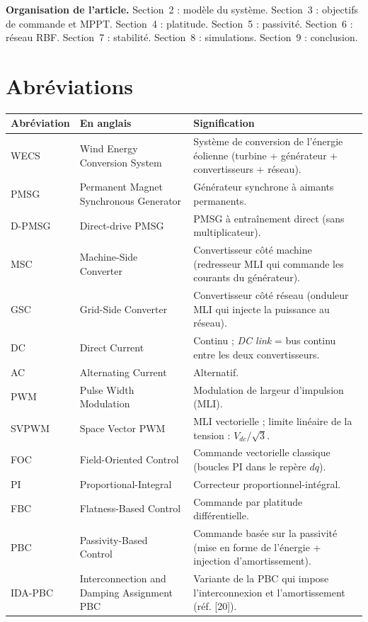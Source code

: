 \documentclass[11pt,a4paper]{article}
\begin{document}
\textbf{Organisation de l'article.} Section~2 : modèle du système. Section~3 : objectifs de commande et
MPPT. Section~4 : platitude. Section~5 : passivité. Section~6 : réseau RBF. Section~7 : stabilité.
Section~8 : simulations. Section~9 : conclusion.

\section{Abréviations}
\begin{longtable}{@{}p{1.9cm}p{5.6cm}p{7.4cm}@{}}
\toprule
Abréviation & En anglais & Signification\\
\midrule
\endhead
WECS & Wind Energy Conversion System & Système de conversion de l'énergie éolienne (turbine + générateur + convertisseurs + réseau).\\
PMSG & Permanent Magnet Synchronous Generator & Générateur synchrone à aimants permanents.\\
D-PMSG & Direct-drive PMSG & PMSG à entraînement direct (sans multiplicateur).\\
MSC & Machine-Side Converter & Convertisseur côté machine (redresseur MLI qui commande les courants du générateur).\\
GSC & Grid-Side Converter & Convertisseur côté réseau (onduleur MLI qui injecte la puissance au réseau).\\
DC & Direct Current & Continu ; \emph{DC link} = bus continu entre les deux convertisseurs.\\
AC & Alternating Current & Alternatif.\\
PWM & Pulse Width Modulation & Modulation de largeur d'impulsion (MLI).\\
SVPWM & Space Vector PWM & MLI vectorielle ; limite linéaire de la tension : $V_{dc}/\sqrt3$.\\
FOC & Field-Oriented Control & Commande vectorielle classique (boucles PI dans le repère $dq$).\\
PI & Proportional-Integral & Correcteur proportionnel-intégral.\\
FBC & Flatness-Based Control & Commande par platitude différentielle.\\
PBC & Passivity-Based Control & Commande basée sur la passivité (mise en forme de l'énergie + injection d'amortissement).\\
IDA-PBC & Interconnection and Damping Assignment PBC & Variante de la PBC qui impose l'interconnexion et l'amortissement (réf. [20]).\\

\end{longtable}
\end{document}
